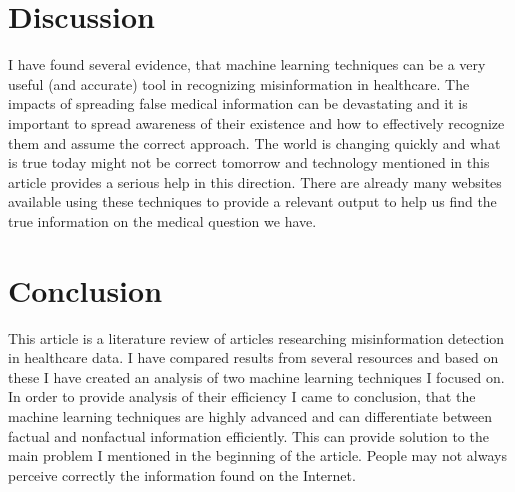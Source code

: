 \documentclass[11pt ,english,a4paper]{article}
\begin{document}
\section{Discussion}

I have found several evidence, that machine learning techniques can be a very useful (and accurate) tool in recognizing misinformation in healthcare. The impacts of spreading false medical information can be devastating and it is important to spread awareness of their existence and how to effectively recognize them and assume the correct approach. The world is changing quickly and what is true today might not be correct tomorrow and technology mentioned in this article provides a serious help in this direction. There are already many websites available using these techniques to provide a relevant output to help us find the true information on the medical question we have.

\section{Conclusion}\label{conclusion}

This article is a literature review of articles researching misinformation detection in healthcare data. I have compared results from several resources and based on these I have created an analysis of two machine learning techniques I focused on. In order to provide analysis of their efficiency I came to conclusion, that the machine learning techniques are highly advanced and can differentiate between factual and nonfactual information efficiently. This can provide solution to the main problem I mentioned in the beginning of the article. People may not always perceive correctly the information found on the Internet. 

\newpage

\end{document}
